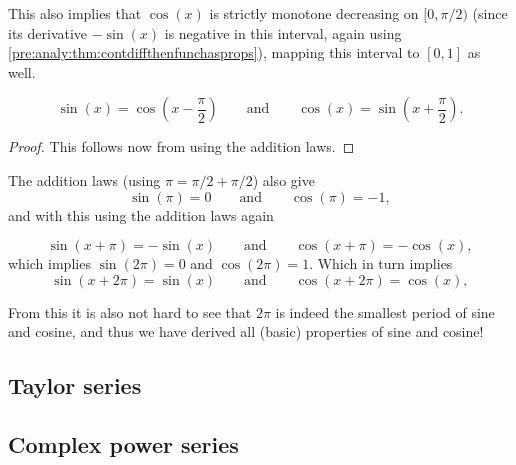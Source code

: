 \documentclass[10pt, a4paper]{article}
\begin{document}
This also implies that $\cos(x)$ is strictly monotone decreasing on $[0, \pi / 2)$
(since its derivative $-\sin(x)$ is negative in this interval,
again using \autoref{pre:analy:thm:contdiffthenfunchasprops}),
mapping this interval to $[0, 1]$ as well.

\begin{theorem}
    \[
    \sin(x) = \cos\left(x - \frac{\pi}{2}\right)\qquad\text{and}\qquad\cos(x) = \sin\left(x + \frac{\pi}{2}\right).
    \]
    \begin{proof}
        This follows now from using the addition laws.
    \end{proof}
\end{theorem}

The addition laws
(using $\pi = \pi / 2 + \pi / 2$)
also give
\[
\sin(\pi) = 0\qquad\text{and}\qquad\cos(\pi) = -1,
\]
and with this using the addition laws again
\begin{theorem}
    \[
    \sin(x + \pi) = -\sin(x)\qquad\text{and}\qquad\cos(x + \pi) = -\cos(x),
    \]
    which implies $\sin(2\pi) = 0$ and $\cos(2\pi) = 1$.
    Which in turn implies
    \[
    \sin(x + 2\pi) = \sin(x)\qquad\text{and}\qquad\cos(x + 2\pi) = \cos(x),
    \]
\end{theorem}
From this it is also not hard to see that $2\pi$ is indeed the smallest period of sine and cosine,
and thus we have derived all
(basic)
properties of sine and cosine!











































\subsection{Taylor series}

\subsection{Complex power series}
\end{document}
